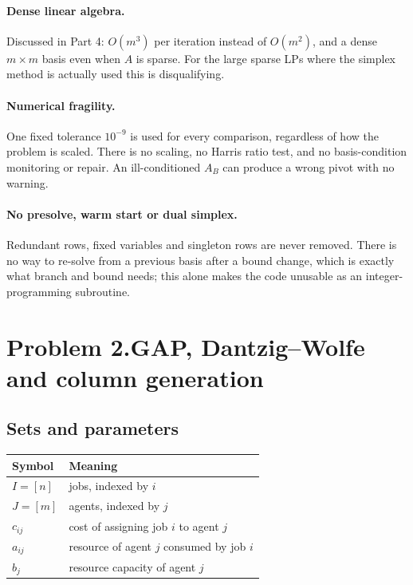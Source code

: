 \documentclass[11pt]{article}
\theoremstyle{definition}
\theoremstyle{plain}
\begin{document}
\paragraph{Dense linear algebra.} Discussed in Part 4: $O(m^3)$ per
iteration instead of $O(m^2)$, and a dense $m \times m$ basis even when
$A$ is sparse. For the large sparse LPs where the simplex method is
actually used this is disqualifying.

\paragraph{Numerical fragility.} One fixed tolerance $10^{-9}$ is used
for every comparison, regardless of how the problem is scaled. There is
no scaling, no Harris ratio test, and no basis-condition monitoring or
repair. An ill-conditioned $A_B$ can produce a wrong pivot with no
warning.

\paragraph{No presolve, warm start or dual simplex.} Redundant rows,
fixed variables and singleton rows are never removed. There is no way to
re-solve from a previous basis after a bound change, which is exactly
what branch and bound needs; this alone makes the code unusable as an
integer-programming subroutine.

\newpage
\section*{Problem 2.\quad GAP, Dantzig--Wolfe and column generation
  \quad[70 pts]}

\subsection*{Sets and parameters}

\begin{center}
\begin{tabular}{@{}ll@{}}
\toprule
Symbol & Meaning \\
\midrule
$I = [n]$ & jobs, indexed by $i$ \\
$J = [m]$ & agents, indexed by $j$ \\
$c_{ij}$ & cost of assigning job $i$ to agent $j$ \\
$a_{ij}$ & resource of agent $j$ consumed by job $i$ \\
$b_j$ & resource capacity of agent $j$ \\
\bottomrule
\end{tabular}
\end{center}
\end{document}

